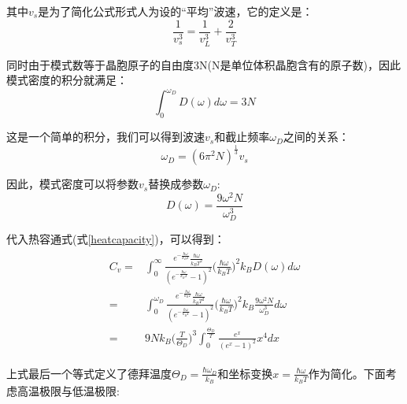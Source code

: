 \documentclass{ctexart}
\begin{document}
                其中$v_s$是为了简化公式形式人为设的“平均”波速，它的定义是：
                \begin{equation}
                    \frac{1}{v_s^3}=\frac{1}{v_L^3}+\frac{2}{v_T^3}
                \end{equation}
                
                同时由于模式数等于晶胞原子的自由度3N(N是单位体积晶胞含有的原子数)，因此模式密度的积分就满足：
                \begin{equation}
                    \int_0^{\omega_D} D(\omega)d\omega =3N
                \end{equation}
                
                这是一个简单的积分，我们可以得到波速$v_s$和截止频率$\omega_D$之间的关系：
                \begin{equation}
                    \omega_D=(6\pi^2N)^{\frac{1}{3}}v_s
                \end{equation}
                
                因此，模式密度可以将参数$v_s$替换成参数$\omega_D$:
                \begin{equation}
                    D(\omega)=\frac{9\omega^2N}{\omega_D^3}
                \end{equation}
                
                代入热容通式(式\eqref{heatcapacity})，可以得到：
                \begin{align}\label{equ:heatcapacity_D}
                    \begin{split}
                        C_v=&\int_0^\infty \frac{e^{-\frac{\hbar\omega}{k_BT}}\frac{\hbar\omega}{k_BT^2}}{(e^{-\frac{\hbar\omega}{k_BT}}-1)^2}\Big(\frac{\hbar\omega}{k_BT}\Big)^2 k_B D(\omega)d\omega\\
                        =& \int_0^{\omega_D} \frac{e^{-\frac{\hbar\omega}{k_BT}}\frac{\hbar\omega}{k_BT^2}}{(e^{-\frac{\hbar\omega}{k_BT}}-1)^2}\Big(\frac{\hbar\omega}{k_BT}\Big)^2 k_B \frac{9\omega^2N}{\omega_D^3}d\omega\\
                        =& 9Nk_B\Big(\frac{T}{\Theta_D}\Big)^3\int_0^{\frac{\Theta_D}{T}} \frac{e^{x}}{(e^{x}-1)^2}x^4dx 
                    \end{split}
                \end{align}
                
                上式最后一个等式定义了德拜温度$\Theta_D=\frac{\hbar\omega_D}{k_B}$和坐标变换$x=\frac{\hbar\omega}{k_BT}$作为简化。下面考虑高温极限与低温极限:
                
\end{document}
